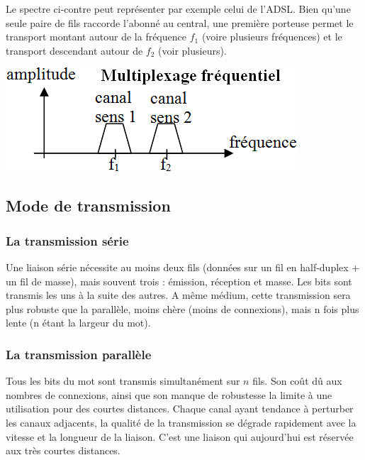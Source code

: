 \documentclass[10pt]{article}
\begin{document}
\begin{minipage}[c]{.6\linewidth}
Le spectre ci-contre peut représenter par exemple celui de l’ADSL. Bien qu’une seule paire de fils raccorde l’abonné au central, une première porteuse permet le transport montant autour de la fréquence $f_1$ (voire plusieurs fréquences) et le transport descendant autour de $f_2$ (voir plusieurs).
\end{minipage} \hfill
\begin{minipage}[c]{.36\linewidth}
\begin{center}
\includegraphics[width=.95\textwidth]{images/fig_05}
\end{center}
\end{minipage} 

\subsection{Mode de transmission}

\subsubsection*{La transmission série}
Une liaison série nécessite au moins deux fils (données sur un fil en half-duplex + un fil de masse), mais souvent trois : émission, réception et masse. Les bits sont transmis les uns à la suite des autres. A même médium, cette transmission sera plus robuste que la parallèle, moins chère (moins de connexions), mais n fois plus lente (n étant la largeur du mot).

\subsubsection*{La transmission parallèle}
Tous les bits du mot sont transmis simultanément sur $n$ fils.
Son coût dû aux nombres de connexions, ainsi que son manque de robustesse la limite à une utilisation pour des courtes distances. Chaque canal ayant tendance à perturber les canaux adjacents, la qualité de la transmission se dégrade rapidement avec la vitesse et la longueur de la liaison. C’est une liaison qui aujourd’hui est réservée aux très courtes distances.
\end{document}
